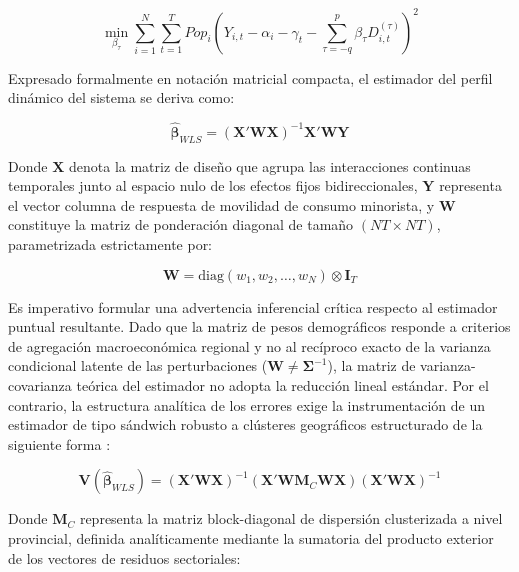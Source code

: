 \begin{equation}
    \min_{\beta_{\tau}} \sum_{i=1}^{N} \sum_{t=1}^{T} Pop_i \left( Y_{i,t} - \alpha_i - \gamma_t - \sum_{\tau = -q}^{p} \beta_{\tau} D_{i,t}^{(\tau)} \right)^2
\end{equation}

Expresado formalmente en notaci\'on matricial compacta, el estimador del perfil din\'amico del sistema se deriva como:

\begin{equation}
    \hat{\mathbf{\beta}}_{WLS} = \left( \mathbf{X}' \mathbf{W} \mathbf{X} \right)^{-1} \mathbf{X}' \mathbf{W} \mathbf{Y}
\end{equation}

Donde $\mathbf{X}$ denota la matriz de dise\~no que agrupa las interacciones continuas temporales junto al espacio nulo de los efectos fijos bidireccionales, $\mathbf{Y}$ representa el vector columna de respuesta de movilidad de consumo minorista, y $\mathbf{W}$ constituye la matriz de ponderaci\'on diagonal de tama\~no $(NT \times NT)$, parametrizada estrictamente por:

\begin{equation}
    \mathbf{W} = \text{diag}(w_1, w_2, \dots, w_N) \otimes \mathbf{I}_T
\end{equation}

Es imperativo formular una advertencia inferencial cr\'itica respecto al estimador puntual resultante. Dado que la matriz de pesos demogr\'aficos responde a criterios de agregaci\'on macroecon\'omica regional y no al rec\'iproco exacto de la varianza condicional latente de las perturbaciones ($\mathbf{W} \neq \mathbf{\Sigma}^{-1}$), la matriz de varianza-covarianza te\'orica del estimador no adopta la reducci\'on lineal est\'andar. Por el contrario, la estructura anal\'itica de los errores exige la instrumentaci\'on de un estimador de tipo s\'andwich robusto a cl\'usteres geogr\'aficos estructurado de la siguiente forma \citep{cameron2006robust, wooldridge2011econometric}:

\begin{equation}
    \mathbf{V}(\hat{\mathbf{\beta}}_{WLS}) = \left( \mathbf{X}' \mathbf{W} \mathbf{X} \right)^{-1} \left( \mathbf{X}' \mathbf{W} \mathbf{M}_C \mathbf{W} \mathbf{X} \right) \left( \mathbf{X}' \mathbf{W} \mathbf{X} \right)^{-1}
\end{equation}

Donde $\mathbf{M}_C$ representa la matriz block-diagonal de dispersi\'on clusterizada a nivel provincial, definida anal\'iticamente mediante la sumatoria del producto exterior de los vectores de residuos sectoriales:

